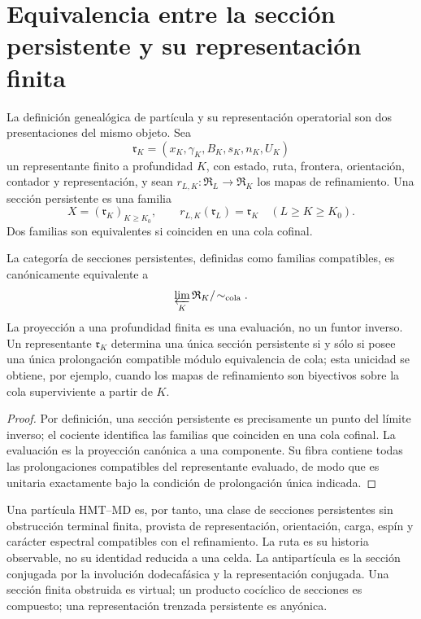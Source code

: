 \section{Equivalencia entre la sección persistente y su representación finita}

La definición genealógica de partícula y su representación operatorial son
dos presentaciones del mismo objeto. Sea
\[
 \mathfrak r_K=(x_K,\gamma_K,B_K,s_K,n_K,U_K)
\]
un representante finito a profundidad \(K\), con estado, ruta, frontera,
orientación, contador y representación, y sean
\(r_{L,K}:\mathfrak R_L\to\mathfrak R_K\) los mapas de refinamiento. Una
sección persistente es una familia
\[
 X=(\mathfrak r_K)_{K\ge K_0},
 \qquad r_{L,K}(\mathfrak r_L)=\mathfrak r_K
 \quad(L\ge K\ge K_0).
\]
Dos familias son equivalentes si coinciden en una cola cofinal.

\begin{theorem}
La categoría de secciones persistentes, definidas como familias compatibles,
es canónicamente equivalente a
\[
 \varprojlim_K\mathfrak R_K/\!\sim_{\rm cola}.
\]
La proyección a una profundidad finita es una evaluación, no un funtor inverso.
Un representante \(\mathfrak r_K\) determina una única sección persistente si
y sólo si posee una única prolongación compatible módulo equivalencia de cola;
esta unicidad se obtiene, por ejemplo, cuando los mapas de refinamiento son
biyectivos sobre la cola superviviente a partir de \(K\).
\end{theorem}

\begin{proof}
Por definición, una sección persistente es precisamente un punto del límite
inverso; el cociente identifica las familias que coinciden en una cola cofinal.
La evaluación es la proyección canónica a una componente. Su fibra contiene
todas las prolongaciones compatibles del representante evaluado, de modo que
es unitaria exactamente bajo la condición de prolongación única indicada.
\end{proof}

Una partícula HMT--MD es, por tanto, una clase de secciones persistentes sin
obstrucción terminal finita, provista de representación, orientación, carga,
espín y carácter espectral compatibles con el refinamiento. La ruta es su
historia observable, no su identidad reducida a una celda. La antipartícula
es la sección conjugada por la involución dodecafásica y la representación
conjugada. Una sección finita obstruida es virtual; un producto cocíclico de
secciones es compuesto; una representación trenzada persistente es anyónica.

